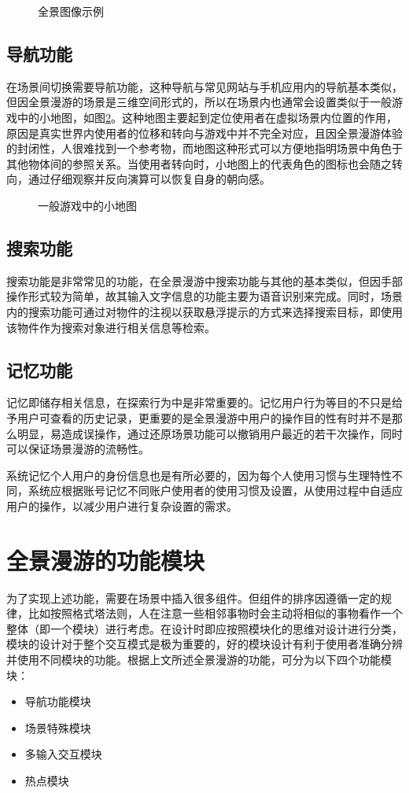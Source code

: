\begin{figure}[htp]
\centering
{}
\caption{全景图像示例}
\label{fig:hongcun}
\end{figure}

\subsection{导航功能}
在场景间切换需要导航功能，这种导航与常见网站与手机应用内的导航基本类似，但因全景漫游的场景是三维空间形式的，所以在场景内也通常会设置类似于一般游戏中的小地图，如图\ref{fig:minimap}。这种地图主要起到定位使用者在虚拟场景内位置的作用，原因是真实世界内使用者的位移和转向与游戏中并不完全对应，且因全景漫游体验的封闭性，人很难找到一个参考物，而地图这种形式可以方便地指明场景中角色于其他物体间的参照关系。当使用者转向时，小地图上的代表角色的图标也会随之转向，通过仔细观察并反向演算可以恢复自身的朝向感。

\begin{figure}[htp]
\centering
{}
\caption{一般游戏中的小地图}
\label{fig:minimap}
\end{figure}

\subsection{搜索功能}
搜索功能是非常常见的功能，在全景漫游中搜索功能与其他的基本类似，但因手部操作形式较为简单，故其输入文字信息的功能主要为语音识别来完成。同时，场景内的搜索功能可通过对物件的注视以获取悬浮提示的方式来选择搜索目标，即使用该物件作为搜索对象进行相关信息等检索。

\subsection{记忆功能}
记忆即储存相关信息，在探索行为中是非常重要的。记忆用户行为等目的不只是给予用户可查看的历史记录，更重要的是全景漫游中用户的操作目的性有时并不是那么明显，易造成误操作，通过还原场景功能可以撤销用户最近的若干次操作，同时可以保证场景漫游的流畅性。

系统记忆个人用户的身份信息也是有所必要的，因为每个人使用习惯与生理特性不同，系统应根据账号记忆不同账户使用者的使用习惯及设置，从使用过程中自适应用户的操作，以减少用户进行复杂设置的需求。


\section{全景漫游的功能模块}
为了实现上述功能，需要在场景中插入很多组件。但组件的排序因遵循一定的规律，比如按照格式塔法则，人在注意一些相邻事物时会主动将相似的事物看作一个整体（即一个模块）进行考虑。在设计时即应按照模块化的思维对设计进行分类，模块的设计对于整个交互模式是极为重要的，好的模块设计有利于使用者准确分辨并使用不同模块的功能。根据上文所述全景漫游的功能，可分为以下四个功能模块：
\begin{itemize}
	\item 导航功能模块
	\item 场景特殊模块
	\item 多输入交互模块
	\item 热点模块
\end{itemize}

